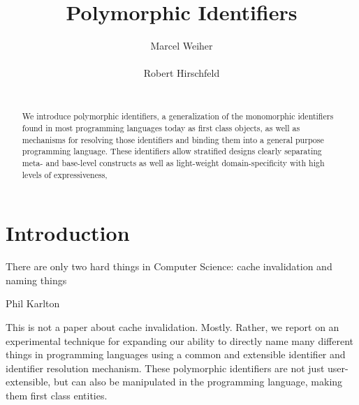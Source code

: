 \documentclass[preprint,authoryear]{acm_proc_article-sp}
\begin{document}


\title{Polymorphic Identifiers}

\author{
\alignauthor Marcel Weiher\\
       \\
\alignauthor Robert Hirschfeld\\
       \\
}

\maketitle

\begin{abstract}
We introduce polymorphic identifiers, a generalization of the monomorphic identifiers found in most
programming languages today as first class objects, as well as mechanisms for
resolving those identifiers and binding them into a general purpose programming language.
These identifiers allow stratified designs clearly separating meta- and base-level constructs
as well as light-weight domain-specificity with high levels of expressiveness, 
\end{abstract}


\setlength{\epigraphrule}{0pt}


\section{Introduction}
\epigraph{There are only two hard things in Computer Science:  cache invalidation and naming things} {Phil Karlton}

This is not a paper about cache invalidation.  Mostly.   Rather, we report on an experimental
technique for expanding our ability to directly name many different things in 
programming languages using a common and extensible identifier and identifier resolution
mechanism.
These polymorphic identifiers are not just user-extensible,
but can also be manipulated in the programming language, making them first class 
entities.
\end{document}
